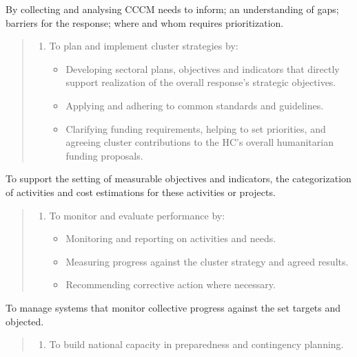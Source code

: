 \documentclass[
  a4paper,
  onecolumn,
  oneside]{book}
\providecommand{\tightlist}{%
  \setlength{\itemsep}{0pt}\setlength{\parskip}{0pt}}\usepackage{longtable,booktabs,array}
\begin{document}
By collecting and analysing CCCM needs to inform; an understanding of
gaps; barriers for the response; where and whom requires prioritization.

\begin{quote}
\begin{enumerate}
\def\labelenumi{\arabic{enumi}.}
\setcounter{enumi}{2}
\tightlist
\item
  To plan and implement cluster strategies by:

  \begin{itemize}
  \tightlist
  \item
    Developing sectoral plans, objectives and indicators that directly
    support realization of the overall response's strategic objectives.
  \item
    Applying and adhering to common standards and guidelines.
  \item
    Clarifying funding requirements, helping to set priorities, and
    agreeing cluster contributions to the HC's overall humanitarian
    funding proposals.
  \end{itemize}
\end{enumerate}
\end{quote}

To support the setting of measurable objectives and indicators, the
categorization of activities and cost estimations for these activities
or projects.

\begin{quote}
\begin{enumerate}
\def\labelenumi{\arabic{enumi}.}
\setcounter{enumi}{3}
\tightlist
\item
  To monitor and evaluate performance by:

  \begin{itemize}
  \tightlist
  \item
    Monitoring and reporting on activities and needs.
  \item
    Measuring progress against the cluster strategy and agreed results.
  \item
    Recommending corrective action where necessary.
  \end{itemize}
\end{enumerate}
\end{quote}

To manage systems that monitor collective progress against the set
targets and objected.

\begin{quote}
\begin{enumerate}
\def\labelenumi{\arabic{enumi}.}
\setcounter{enumi}{4}
\tightlist
\item
  To build national capacity in preparedness and contingency planning.
\end{enumerate}
\end{quote}
\end{document}
